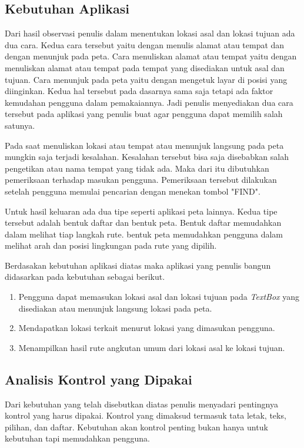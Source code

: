 \subsection{Kebutuhan Aplikasi}
\label{lab:Kebutuhan Aplikasi}
\hspace{0.5cm} Dari hasil observasi penulis dalam menentukan lokasi asal dan lokasi tujuan ada dua cara. Kedua cara tersebut yaitu dengan menulis alamat atau tempat dan dengan menunjuk pada peta. Cara menuliskan alamat atau tempat yaitu dengan menuliskan alamat atau tempat pada tempat yang disediakan untuk asal dan tujuan. Cara menunjuk pada peta yaitu dengan mengetuk layar di posisi yang diinginkan. Kedua hal tersebut pada dasarnya sama saja tetapi ada faktor kemudahan pengguna dalam pemakaiannya. Jadi penulis menyediakan dua cara tersebut pada aplikasi yang penulis buat agar pengguna dapat memilih salah satunya.

Pada saat menuliskan lokasi atau tempat atau menunjuk langsung pada peta mungkin saja terjadi kesalahan. Kesalahan tersebut bisa saja disebabkan salah pengetikan atau nama tempat yang tidak ada. Maka dari itu dibutuhkan pemeriksaan terhadap masukan pengguna. Pemeriksaan tersebut dilakukan setelah pengguna memulai pencarian dengan menekan tombol "FIND".

Untuk hasil keluaran ada dua tipe seperti aplikasi peta lainnya. Kedua tipe tersebut adalah bentuk daftar dan bentuk peta. Bentuk daftar memudahkan dalam melihat tiap langkah rute. bentuk peta memudahkan pengguna dalam melihat arah dan posisi lingkungan pada rute yang dipilih.

\hspace{0.5cm} Berdasakan kebutuhan aplikasi diatas maka aplikasi yang penulis bangun didasarkan pada kebutuhan sebagai berikut.
\begin{enumerate}
	\item Pengguna dapat memasukan lokasi asal dan lokasi tujuan pada \textit{TextBox} yang disediakan atau menunjuk langsung lokasi pada peta.
	\item Mendapatkan lokasi terkait menurut lokasi yang dimasukan pengguna.
	\item Menampilkan hasil rute angkutan umum dari lokasi asal ke lokasi tujuan.
\end{enumerate}

\subsection{Analisis Kontrol yang Dipakai}
\label{lab:Analisis Kontrol yang Dipakai}
\hspace{0.5cm} Dari kebutuhan yang telah disebutkan diatas penulis menyadari pentingnya kontrol yang harus dipakai. Kontrol yang dimaksud termasuk tata letak, teks, pilihan, dan daftar. Kebutuhan akan kontrol penting bukan hanya untuk kebutuhan tapi memudahkan pengguna.

